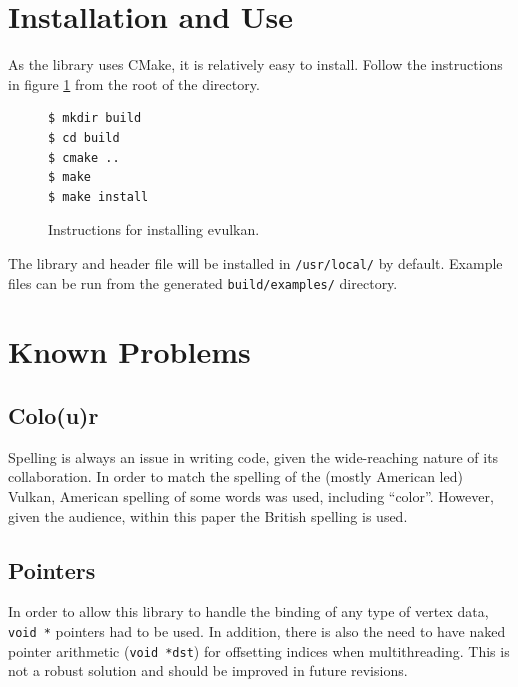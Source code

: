 \documentclass[12pt]{report}
\theoremstyle{definition}
\begin{document}
    \section{Installation and Use}

        As the library uses CMake, it is relatively easy to install. Follow
        the instructions in figure \ref{fig:installation} from the root of the directory.

          \begin{figure}[h!]
            \centering
            \begin{verbatim}
$ mkdir build
$ cd build
$ cmake ..
$ make
$ make install
            \end{verbatim}
            \caption{Instructions for installing evulkan.}
            \label{fig:installation}
          \end{figure}

        The library and header file will be installed in \texttt{/usr/local/} by default.
        Example files can be run from the generated \texttt{build/examples/} directory.

        
    \section{Known Problems}

      \subsection{Colo(u)r}

        Spelling is always an issue in writing code, given the wide-reaching
        nature of its collaboration. In order to match the spelling of the
        (mostly American led) Vulkan, American spelling of some words was used,
        including ``color''. However, given the audience, within this paper the
        British spelling is used.

      \subsection{Pointers}

        In order to allow this library to handle the binding of any type of
        vertex data, \verb|void *| pointers had to be used. In addition, there is also the need to
        have naked pointer arithmetic (\verb|void *dst|) for offsetting indices when multithreading. This is
        not a robust solution and should be improved in future revisions.
\end{document}
